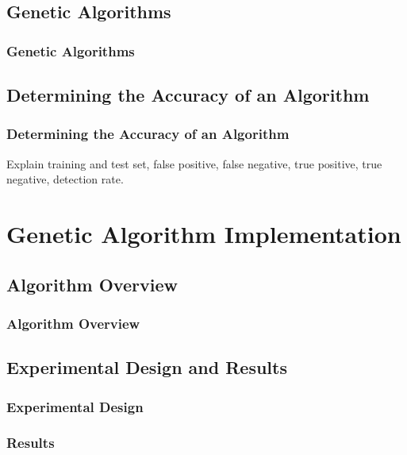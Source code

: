 \documentclass{beamer}
\begin{document}
\subsection{Genetic Algorithms}
\begin{frame}
  \frametitle{Genetic Algorithms}

\end{frame}


\subsection{Determining the Accuracy of an Algorithm}
\begin{frame}
  \frametitle{Determining the Accuracy of an Algorithm}
Explain training and test set, false positive, false negative, true positive, true negative, detection rate.
\end{frame}
\section[Genetic Algorithm Implementation]{Genetic Algorithm Implementation}
\subsection{Algorithm Overview}
\begin{frame}
  \frametitle{Algorithm Overview}

\end{frame}


\subsection{Experimental Design and Results}
\begin{frame}
  \frametitle{Experimental Design}

\end{frame}


\begin{frame}
  \frametitle{Results}

\end{frame}
\end{document}
